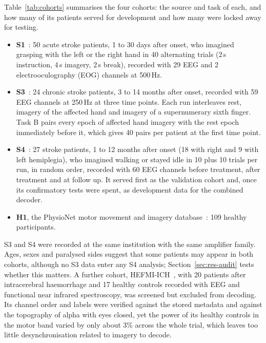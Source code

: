 \documentclass[pdflatex,sn-mathphys-num]{sn-jnl}
\begin{document}
Table~\ref{tab:cohorts} summarises the four cohorts: the source and task of each, and how many of its patients served for development and how many were locked away for testing.
\begin{itemize}
\item \textbf{S1}~\cite{liu2024}: 50 acute stroke patients, 1 to 30 days after onset, who imagined grasping with the left or the right hand in 40 alternating trials (2\,s instruction, 4\,s imagery, 2\,s break), recorded with 29 EEG and 2 electrooculography (EOG) channels at 500\,Hz.
\item \textbf{S3}~\cite{wang2026}: 24 chronic stroke patients, 3 to 14 months after onset, recorded with 59 EEG channels at 250\,Hz at three time points. Each run interleaves rest, imagery of the affected hand and imagery of a supernumerary sixth finger. Task B pairs every epoch of affected hand imagery with the rest epoch immediately before it, which gives 40 pairs per patient at the first time point.
\item \textbf{S4}~\cite{liu2025gait}: 27 stroke patients, 1 to 12 months after onset (18 with right and 9 with left hemiplegia), who imagined walking or stayed idle in 10 plus 10 trials per run, in random order, recorded with 60 EEG channels before treatment, after treatment and at follow up. It served first as the validation cohort and, once its confirmatory tests were spent, as development data for the combined decoder.
\item \textbf{H1}, the PhysioNet motor movement and imagery database~\cite{schalk2004,goldberger2000}: 109 healthy participants.
\end{itemize}
S3 and S4 were recorded at the same institution with the same amplifier family. Ages, sexes and paralysed sides suggest that some patients may appear in both cohorts, although no S3 data enter any S4 analysis; Section~\ref{sec:res-audit} tests whether this matters. A further cohort, HEFMI-ICH~\cite{shi2025}, with 20 patients after intracerebral haemorrhage and 17 healthy controls recorded with EEG and functional near infrared spectroscopy, was screened but excluded from decoding. Its channel order and labels were verified against the stored metadata and against the topography of alpha with eyes closed, yet the power of its healthy controls in the motor band varied by only about 3\% across the whole trial, which leaves too little desynchronisation related to imagery to decode.
\end{document}
